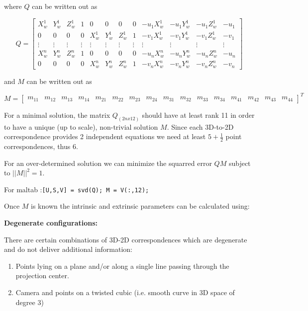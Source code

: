 \documentclass[10pt,a4paper]{scrartcl}
\begin{document}
\begin{multicols*}{2}
where $Q$ can be written out as

\setcounter{MaxMatrixCols}{20}
\begin{equation*}
Q=\begin{bmatrix}
X_w^1&Y_w^1&Z_w^1&1&0&0&0&0&-u_1X_w^1&-u_1Y_w^1&-u_1Z_w^1&-u_1\\
0&0&0&0&X_w^1&Y_w^1&Z_w^1&1&-v_1X_w^1&-v_1Y_w^1&-v_1Z_w^1&-v_1\\
\vdots&\vdots&\vdots&\vdots&\vdots&\vdots&\vdots&\vdots&\vdots&\vdots&\vdots&\vdots\\
X_w^n&Y_w^n&Z_w^n&1&0&0&0&0&-u_nX_w^n&-u_nY_w^n&-u_nZ_w^n&-u_n\\
0&0&0&0&X_w^n&Y_w^n&Z_w^n&1&-v_nX_w^n&-v_nY_w^n&-v_nZ_w^n&-v_n
\end{bmatrix}
\end{equation*}

and $M$ can be written out as

\begin{tiny}
\begin{equation*}
M=\begin{bmatrix}
m_{11}&m_{12}&m_{13}&m_{14}&
m_{21}&m_{22}&m_{23}&m_{24}&
m_{31}&m_{32}&m_{33}&m_{34}&
m_{41}&m_{42}&m_{43}&m_{44}
\end{bmatrix}^T
\end{equation*}
\end{tiny}

For a minimal solution, the matrix $Q_{(2nx12)}$ should have at least rank 11 in order to have a unique (up to scale), non-trivial solution $M$. Since each 3D-to-2D correspondence provides 2 independent equations we need at least $5+\frac{1}{2}$ point correspondences, thus $6$.

For an over-determined solution we can minimize the squarred error $QM$ subject to $||M||^2=1$.

For maltab :\verb+[U,S,V] = svd(Q); M = V(:,12);+

\vspace{3ex}

Once $M$ is known the intrinsic and extrinsic parameters can be calculated using:


\textbf{Degenerate configurations:}

There are certain combinations of 3D-2D correspondences which are degenerate and do not deliver additional information:

\begin{enumerate}
\item Points lying on a plane and/or along a single line passing through the projection center.
\item Camera and points on a twisted cubic (i.e. smooth curve in 3D space of degree 3)
\end{enumerate}


\end{multicols*}
\end{document}
